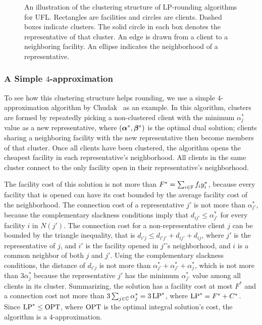 \documentclass[oneside,final]{ucr}
\def\dsp{\def\baselinestretch{2.0}\large\normalsize}
\def\ssp{\def\baselinestretch{1.0}\large\normalsize}
\begin{document}
\begin{figure}[ht]
  \ssp
  \caption[Illustration of the clustering structure of
  LP-rounding algorithms for UFL.]{An illustration of the
    clustering structure of LP-rounding algorithms for
    UFL. Rectangles are facilities and circles are
    clients. Dashed boxes indicate clusters. The solid
    circle in each box denotes the representative of that
    cluster. An edge is drawn from a client to a neighboring
    facility. An ellipse indicates the neighborhood of a
    representative.}
  \label{fig:STA97}
\end{figure}
\dsp

\subsubsection{A Simple $4$-approximation}
To see how this clustering structure helps rounding, we use
a simple $4$-approximation algorithm by
Chudak~\cite{Chudak98} as an example. In this algorithm,
clusters are formed by repeatedly picking a non-clustered
client with the minimum $\alpha_j^\ast$ value as a new
representative, where $(\boldsymbol{\alpha}^\ast,\boldsymbol{\beta}^\ast)$ is the
optimal dual solution; clients sharing a neighboring
facility with the new representative then become members of
that cluster. Once all clients have been clustered, the
algorithm opens the cheapest facility in each
representative's neighborhood. All clients in the same
cluster connect to the only facility open in their
representative's neighborhood.

The facility cost of this solution is not more than $F^\ast
= \sum_{i\in\mathbb{F}} f_i y_i^\ast$, because every facility
that is opened can have its cost bounded by the average
facility cost of the neighborhood. The connection cost of a
representative $j'$ is not more than $\alpha_{j'}^\ast$,
because the complementary slackness conditions imply that
$d_{ij'} \leq \alpha_{j'}^\ast$ for every facility $i$ in
$N(j')$. The connection cost for a non-representative client
$j$ can be bounded by the triangle inequality, that is
$d_{i'j} \leq d_{i'j'} + d_{ij'} + d_{ij}$, where $j'$ is
the representative of $j$, and $i'$ is the facility opened
in $j'$'s neighborhood, and $i$ is a common neighbor of both
$j$ and $j'$. Using the complementary slackness conditions,
the distance of $d_{i'j}$ is not more than $\alpha_{j'}^\ast
+ \alpha_{j'}^\ast + \alpha_j^\ast$, which is not more than
$3\alpha_j^\ast$ because the representative $j'$ has the
minimum $\alpha_{j'}^\ast$ value among all clients in its
cluster. Summarizing, the solution has a facility cost at
most $F^\ast$ and a connection cost not more than
$3\sum_{j\in\mathbb{C}} \alpha_j^\ast = 3\,\mbox{\rm LP}^\ast$, where
$\mbox{\rm LP}^\ast = F^\ast + C^\ast$. Since $\mbox{\rm LP}^\ast \leq \mbox{\rm OPT}$,
where $\mbox{\rm OPT}$ is the optimal integral solution's cost, the
algorithm is a $4$-approximation.
\end{document}
